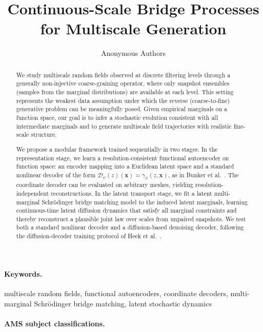 \documentclass[review,onefignum,onetabnum]{siamart250211}
\title{Continuous-Scale Bridge Processes for Multiscale Generation}
\author{Anonymous Authors}
\newenvironment{keywords}{\paragraph{Keywords.}}{}
\newenvironment{AMS}{\paragraph{AMS subject classifications.}}{}
\newcommand{\1}{\mathbf{1}}
\newcommand{\cD}{\mathcal{D}}
\begin{document}
\maketitle

\begin{abstract}
We study multiscale random fields observed at discrete filtering levels through a generally non-injective coarse-graining operator, where only snapshot ensembles (samples from the marginal distributions) are available at each level. This setting represents the weakest data assumption under which the reverse (coarse-to-fine) generative problem can be meaningfully posed. Given empirical marginals on a function space, our goal is to infer a stochastic evolution consistent with all intermediate marginals and to generate multiscale field trajectories with realistic fine-scale structure.

We propose a modular framework trained sequentially in two stages. In the representation stage, we learn a resolution-consistent functional autoencoder on function space: an encoder mapping into a Euclidean latent space and a standard nonlinear decoder of the form $\cD_\psi(z)(\mathbf{x})=\gamma_\psi(z,\mathbf{x})$, as in Bunker et al.~\cite{bunker2025fae}. The coordinate decoder can be evaluated on arbitrary meshes, yielding resolution-independent reconstructions. In the latent transport stage, we fit a latent multi-marginal Schr\"odinger bridge matching model to the induced latent marginals, learning continuous-time latent diffusion dynamics that satisfy all marginal constraints and thereby reconstruct a plausible joint law over scales from unpaired snapshots. We test both a standard nonlinear decoder and a diffusion-based denoising decoder, following the diffusion-decoder training protocol of Heek et al.~\cite{heek2026ul}.
\end{abstract}


\begin{keywords}
multiscale random fields, functional autoencoders, coordinate decoders, multi-marginal Schr\"odinger bridge matching, latent stochastic dynamics
\end{keywords}

\begin{AMS}

\end{AMS}

\tableofcontents
\end{document}
